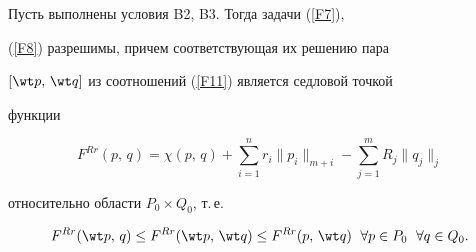 \begin{cornonum}


\label{T2}


Пусть выполнены условия B2, B3. Тогда задачи (\ref{F7}),


(\ref{F8}) разрешимы, причем соответствующая их решению пара


$[\wt p,\, \wt q]$ из соотношений (\ref{F11}) является седловой точкой


функции


$$


F^{Rr}(p,\, q)=\chi(p,\, q)+\sum^n_{i=1}r_i\|p_i\|_{m+i}


-\sum^m_{j=1}R_j\|q_j\|_j


$$


относительно области $P_0\times Q_0$, т.\,е.


$$


F^{Rr}(\wt p,\, q)\le F^{Rr}(\wt p,\, \wt q)\le


F^{Rr}(p,\, \wt q)\ \; \forall p\in P_0\ \; \forall q\in Q_0.


$$


\end{cornonum}





